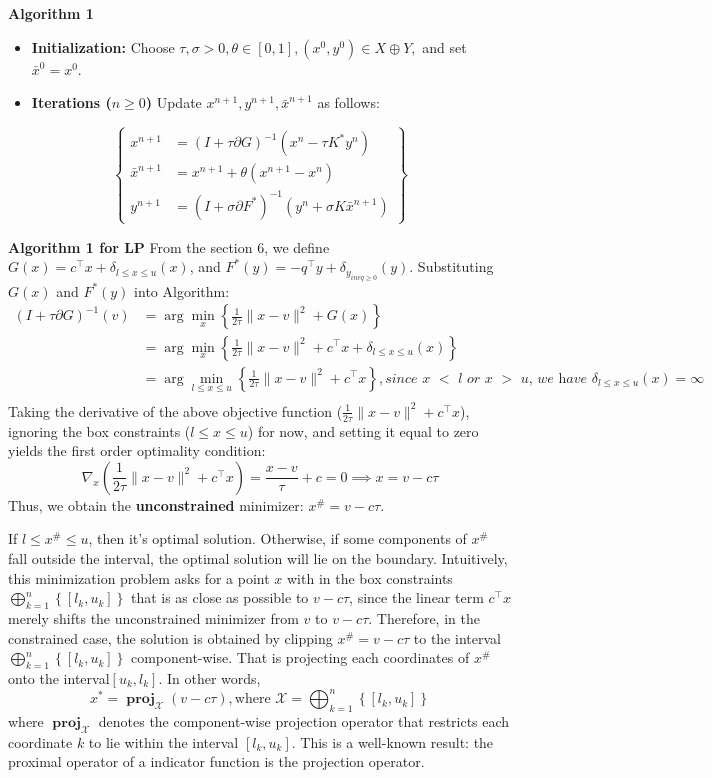 \documentclass[twoside,12pt,openright]{report}  %
\DeclareMathOperator*{\proj}{\textbf{proj}}
\begin{document}
\noindent \textbf{Algorithm 1}
\begin{itemize}
    \item \textbf{Initialization:} Choose \(\tau, \sigma > 0, \theta \in[0,1], (x^0,y^0) \in X \oplus Y,\) and set \(\bar{x}^0 = x^0\).
    \item \textbf{Iterations (\(n \ge 0\))} Update \(x^{n+1},y^{n+1},\bar{x}^{n+1}\) as follows:
\end{itemize}
\[
\left\{
\begin{aligned}
    x^{n+1} &= (I + \tau \partial G)^{-1} (x^n - \tau K^* y^n)\\
    \bar{x}^{n+1} &= x^{n+1}+\theta(x^{n+1}-x^n)\\
    y^{n+1} &= (I + \sigma \partial F^*)^{-1}(y^n+\sigma K \bar{x}^{n+1})
\end{aligned}
\right\}
\]

\noindent \textbf{Algorithm 1 for LP}
From the section 6, we define \(G(x) = c^\top x + \delta_{l \le x \le u}(x)\), and \(F^*(y) = -q^\top y + \delta_{y_{ineq \ge 0}}(y)\). Substituting \(G(x)\) and \(F^*(y)\) into Algorithm:
\[
\begin{aligned}
    (I + \tau \partial G)^{-1}(v) &=  \arg\min_{x}\left\{ \frac{1}{2\tau}\|x - v\|^2 + G(x) \right\}\\
    &= \arg\min_{x}\left\{ \frac{1}{2\tau}\|x - v\|^2 + c^\top x + \delta_{l \le x \le u}(x) \right\}\\
    &= \arg\min_{l\le x \le u}\left\{ \frac{1}{2\tau}\|x - v\|^2 + c^\top x \right\}, \textit{since  x $<$ l or x $>$ u, we have }\delta_{l \le x \le u}(x) = \infty\\
\end{aligned}
\]
Taking the derivative of the above objective function (\( \frac{1}{2\tau}\|x - v\|^2 + c^\top x\)), ignoring the box constraints (\(l \le x \le u\)) for now, and setting it equal to zero yields the first order optimality condition:
\[
\nabla_x(\frac{1}{2\tau}\|x - v\|^2 + c^\top x) = \frac{x-v}{\tau} + c = 0
\implies x = v-c\tau
\]
Thus, we obtain the \textbf{unconstrained} minimizer: \(x^{\#} = v-c\tau\).

If \(l \le x^{\#} \le u\), then it's optimal solution. Otherwise, if some components of \(x^{\#}\) fall outside the interval, the optimal solution will lie on the boundary. Intuitively, this minimization problem asks for a point \(x\) with in the box constraints \(\displaystyle\bigoplus_{k=1}^{n}\left\{[l_k,u_k]\right\}\) that is as close as possible to \(v-c\tau\), since the linear term \(c^\top x\) merely shifts the unconstrained minimizer from \(v\) to \(v - c\tau\). Therefore, in the constrained case, the solution is obtained by clipping \(x^{\#} = v-c\tau\) to the interval \(\displaystyle\bigoplus_{k=1}^{n}\left\{[l_k,u_k]\right\}\) component-wise. That is projecting each coordinates of \(x^{\#}\) onto the interval\([u_k,l_k]\). In other words, 
\[
x^* = \proj_{\mathcal{X}}(v-c\tau), \text{where } \mathcal{X} = \displaystyle\bigoplus_{k=1}^{n}\left\{[l_k,u_k]\right\}
\]
where \(\proj_{\mathcal{X}}\) denotes the component-wise projection operator that restricts each coordinate \(k\) to lie within the interval \([l_k,u_k]\). This is a well-known result: the proximal operator of a indicator function is the projection operator.
\end{document}
